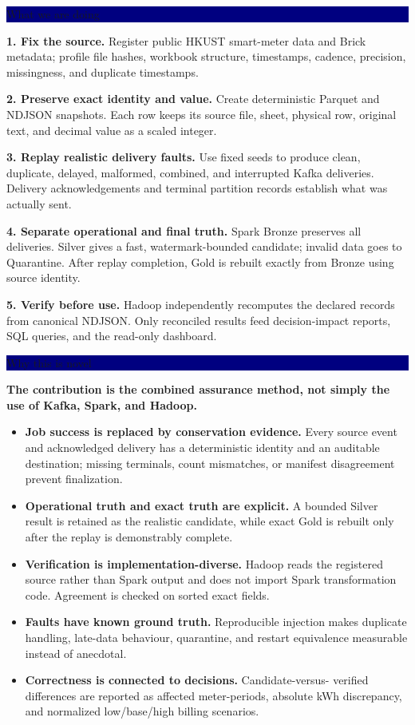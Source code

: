 \documentclass[10pt,a4paper]{article}
\newcommand{\columnheading}[1]{%
  \colorbox{navy}{\parbox{\dimexpr\linewidth-2\fboxsep\relax}{%
    \color{white}\bfseries\large\strut #1\strut}}\par\vspace{3mm}
}
\begin{document}
\begin{minipage}[t]{0.315\textwidth}
\columnheading{What we are doing}

\textbf{1. Fix the source.}
Register public HKUST smart-meter data and Brick metadata; profile file hashes,
workbook structure, timestamps, cadence, precision, missingness, and duplicate
timestamps.

\textbf{2. Preserve exact identity and value.}
Create deterministic Parquet and NDJSON snapshots. Each row keeps its source
file, sheet, physical row, original text, and decimal value as a scaled integer.

\textbf{3. Replay realistic delivery faults.}
Use fixed seeds to produce clean, duplicate, delayed, malformed, combined, and
interrupted Kafka deliveries. Delivery acknowledgements and terminal partition
records establish what was actually sent.

\textbf{4. Separate operational and final truth.}
Spark Bronze preserves all deliveries. Silver gives a fast,
watermark-bounded candidate; invalid data goes to Quarantine. After replay
completion, Gold is rebuilt exactly from Bronze using source identity.

\textbf{5. Verify before use.}
Hadoop independently recomputes the declared records from canonical NDJSON.
Only reconciled results feed decision-impact reports, SQL queries, and the
read-only dashboard.
\end{minipage}
\hfill
\begin{minipage}[t]{0.315\textwidth}
\columnheading{Why this is novel}

\textbf{The contribution is the combined assurance method, not simply the use
of Kafka, Spark, and Hadoop.}

\begin{itemize}
  \item \textbf{Job success is replaced by conservation evidence.} Every
    source event and acknowledged delivery has a deterministic identity and an
    auditable destination; missing terminals, count mismatches, or manifest
    disagreement prevent finalization.
  \item \textbf{Operational truth and exact truth are explicit.} A bounded
    Silver result is retained as the realistic candidate, while exact Gold is
    rebuilt only after the replay is demonstrably complete.
  \item \textbf{Verification is implementation-diverse.} Hadoop reads the
    registered source rather than Spark output and does not import Spark
    transformation code. Agreement is checked on sorted exact fields.
  \item \textbf{Faults have known ground truth.} Reproducible injection makes
    duplicate handling, late-data behaviour, quarantine, and restart
    equivalence measurable instead of anecdotal.
  \item \textbf{Correctness is connected to decisions.} Candidate-versus-
    verified differences are reported as affected meter-periods, absolute kWh
    discrepancy, and normalized low/base/high billing scenarios.
\end{itemize}
\end{minipage}
\end{document}
